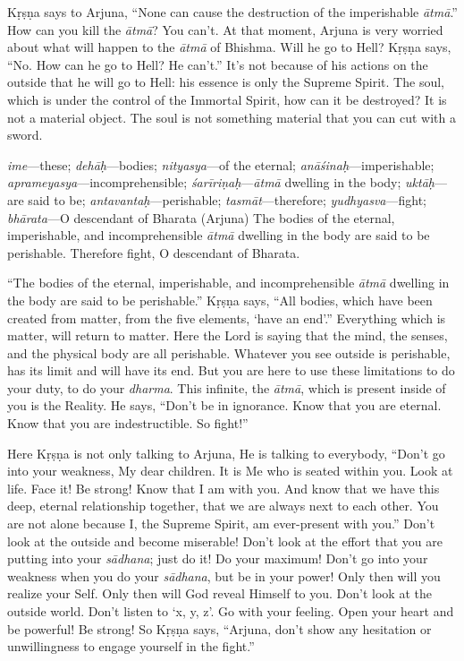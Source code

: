 Kṛṣṇa says to Arjuna, “None can cause the destruction of the imperishable \textit{ātmā}.” How can you kill the \textit{ātmā}? You can’t. At that moment, Arjuna is very worried about what will happen to the \textit{ātmā} of Bhishma. Will he go to Hell? Kṛṣṇa says, “No. How can he go to Hell? He can’t.” It’s not because of his actions on the outside that he will go to Hell: his essence is only the Supreme Spirit. The soul, which is under the control of the Immortal Spirit, how can it be destroyed? It is not a material object. The soul is not something material that you can cut with a sword.

{%
  \textit{ime}---these; 
  \textit{dehāḥ}---bodies; 
  \textit{nityasya}---of the eternal; 
  \textit{anāśinaḥ}---imperishable; 
  \textit{aprameyasya}---incomprehensible; 
  \textit{śarīriṇaḥ}---\textit{ātmā} dwelling in the body; 
  \textit{uktāḥ}---are said to be; 
  \textit{antavantaḥ}---perishable; 
  \textit{tasmāt}---therefore; 
  \textit{yudhyasva}---fight; 
  \textit{bhārata}---O descendant of Bharata (Arjuna)
}
{%
  The bodies of the eternal, imperishable, and incomprehensible \textit{ātmā} dwelling in the body are said to be perishable. Therefore fight, O descendant of Bharata.
}

“The bodies of the eternal, imperishable, and incomprehensible \textit{ātmā} dwelling in the body are said to be perishable.” Kṛṣṇa says, “All bodies, which have been created from matter, from the five elements, ‘have an end’.” Everything which is matter, will return to matter. Here the Lord is saying that the mind, the senses, and the physical body are all perishable. Whatever you see outside is perishable, has its limit and will have its end. But you are here to use these limitations to do your duty, to do your \textit{dharma}. This infinite, the \textit{ātmā}, which is present inside of you is the Reality. He says, “Don’t be in ignorance. Know that you are eternal. Know that you are indestructible. So fight!”

Here Kṛṣṇa is not only talking to Arjuna, He is talking to everybody, “Don’t go into your weakness, My dear children. It is Me who is seated within you. Look at life. Face it! Be strong! Know that I am with you. And know that we have this deep, eternal relationship together, that we are always next to each other. You are not alone because I, the Supreme Spirit, am ever-present with you.” Don’t look at the outside and become miserable! Don’t look at the effort that you are putting into your \textit{sādhana}; just do it! Do your maximum! Don’t go into your weakness when you do your \textit{sādhana}, but be in your power! Only then will you realize your Self. Only then will God reveal Himself to you. Don’t look at the outside world. Don’t listen to ‘x, y, z’. Go with your feeling. Open your heart and be powerful! Be strong! So Kṛṣṇa says, “Arjuna, don’t show any hesitation or unwillingness to engage yourself in the fight.”

